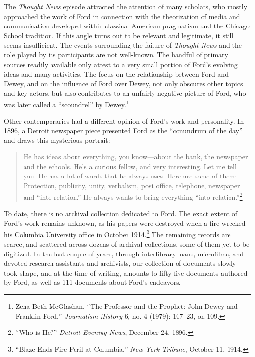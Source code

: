 \documentclass[openany,nobib]{tufte-book}
\begin{document}
The \emph{Thought News} episode attracted the attention of many
scholars, who mostly approached the work of Ford in connection with the
theorization of media and communication developed within classical
American pragmatism and the Chicago School tradition. If this angle
turns out to be relevant and legitimate, it still seems insufficient.
The events surrounding the failure of \emph{Thought News} and the role
played by its participants are not well-known. The handful of primary
sources readily available only attest to a very small portion of Ford's
evolving ideas and many activities. The focus on the relationship
between Ford and Dewey, and on the influence of Ford over Dewey, not
only obscures other topics and key actors, but also contributes to an
unfairly negative picture of Ford, who was later called a ``scoundrel''
by Dewey.\footnote{Zena Beth McGlashan, ``The Professor and the Prophet:
  John Dewey and Franklin Ford,'' \emph{Journalism History} 6\emph{,}
  no. 4 (1979): 107--23, on 109.}

Other contemporaries had a different opinion of Ford's work and
personality. In 1896, a Detroit newspaper piece presented Ford as the
``conundrum of the day'' and draws this mysterious portrait:

\begin{quote}
He has ideas about everything, you know---about the bank, the newspaper
and the schools. He's a curious fellow, and very interesting. Let me
tell you. He has a lot of words that he always uses. Here are some of
them: Protection, publicity, unity, verbalism, post office, telephone,
newspaper and ``into relation.'' He always wants to bring everything
``into relation.''\footnote{``Who is He?'' \emph{Detroit Evening News},
  December 24, 1896.}
\end{quote}

\noindent To date, there is no archival collection dedicated to Ford. The exact
extent of Ford's work remains unknown, as his papers were destroyed when
a fire wrecked his Columbia University office in October
1914.\footnote{``Blaze Ends Fire Peril at Columbia,'' \emph{New York
  Tribune}, October 11, 1914.} The remaining records are scarce, and
scattered across dozens of archival collections, some of them yet to be
digitized. In the last couple of years, through interlibrary loans,
microfilms, and devoted research assistants and archivists, our
collection of documents slowly took shape, and at the time of writing,
amounts to fifty-five documents authored by Ford, as well as 111
documents about Ford's endeavors.
\end{document}
